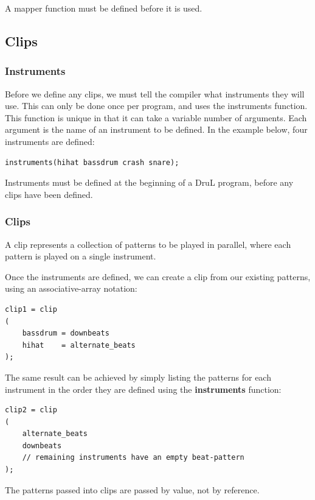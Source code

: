\documentclass[11pt,twoside]{article}
\begin{document}
A mapper function must be defined before it is used.





\subsection{Clips}

\subsubsection{Instruments}

Before we define any clips, we must tell the compiler what instruments they will use.
This can only be done once per program, and uses the instruments function.  This function is unique in that it can take a variable number of arguments.  Each argument is the name of an instrument to be defined.  In the example below, four instruments are defined:

\begin{verbatim}
instruments(hihat bassdrum crash snare);
\end{verbatim}

Instruments must be defined at the beginning of a DruL program, before any clips have been defined.

\subsubsection{Clips}

A clip represents a collection of patterns to be played in parallel, where each pattern is played on a single instrument.

Once the instruments are defined, we can create a clip from our existing patterns, using an
associative-array notation:

\begin{verbatim}
clip1 = clip
(
    bassdrum = downbeats
    hihat    = alternate_beats
);
\end{verbatim}
The same result can be achieved by simply listing the patterns for each instrument in the order they are defined using the \textbf{instruments} function:
\begin{verbatim}
clip2 = clip
(
    alternate_beats
    downbeats
    // remaining instruments have an empty beat-pattern
);

\end{verbatim}
The patterns passed into clips are passed by value, not by reference.
\end{document}
